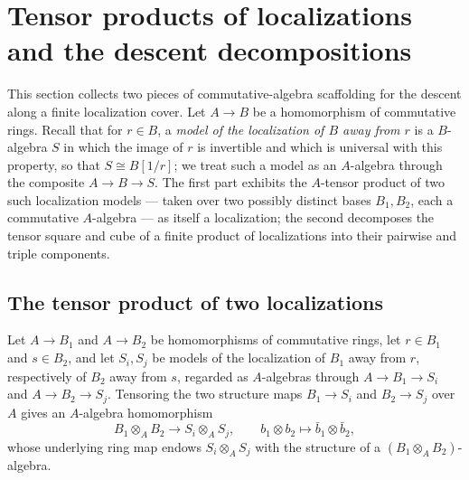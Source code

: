 \section{Tensor products of localizations and the descent decompositions}
\label{pa-sec:tensorAway}

This section collects two pieces of commutative-algebra scaffolding for the descent along a
finite localization cover. Let \(A \to B\) be a homomorphism of commutative rings. Recall that
for \(r \in B\), a \emph{model of the localization of \(B\) away from \(r\)} is a \(B\)-algebra
\(S\) in which the image of \(r\) is invertible and which is universal with this property,
so that \(S \cong B[1/r]\); we treat such a model as an \(A\)-algebra through the composite
\(A \to B \to S\). The first part exhibits the \(A\)-tensor product of two such localization
models — taken over two possibly distinct bases \(B_1, B_2\), each a commutative
\(A\)-algebra — as itself a localization; the second decomposes the tensor square and cube of a
finite product of localizations into their pairwise and triple components.

\subsection{The tensor product of two localizations}

\begin{definition}
  \label{pa-def:tensorAwayAlgebra}
  \leanok

  Let \(A \to B_1\) and \(A \to B_2\) be homomorphisms of commutative rings, let \(r \in B_1\)
  and \(s \in B_2\), and let \(S_i, S_j\) be models of the localization of \(B_1\) away from
  \(r\), respectively of \(B_2\) away from \(s\), regarded as \(A\)-algebras through
  \(A \to B_1 \to S_i\) and \(A \to B_2 \to S_j\). Tensoring the two structure maps
  \(B_1 \to S_i\) and \(B_2 \to S_j\) over \(A\) gives an \(A\)-algebra homomorphism
  \[
    B_1 \otimes_A B_2 \longrightarrow S_i \otimes_A S_j , \qquad
    b_1 \otimes b_2 \mapsto \bar b_1 \otimes \bar b_2 ,
  \]
  whose underlying ring map endows \(S_i \otimes_A S_j\) with the structure of a
  \((B_1 \otimes_A B_2)\)-algebra.
\end{definition}

